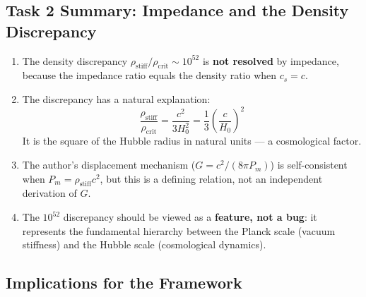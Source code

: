 \documentclass[11pt,a4paper]{article}
\newcommand{\rhocrit}{\ensuremath{\rho_{\mathrm{crit}}}}
\newcommand{\rhostiff}{\ensuremath{\rho_{\mathrm{stiff}}}}
\theoremstyle{definition}
\begin{document}
\subsection{Task 2 Summary: Impedance and the Density Discrepancy}

\begin{enumerate}
    \item The density discrepancy $\rhostiff/\rhocrit \sim 10^{52}$ is \textbf{not resolved} by impedance, because the impedance ratio equals the density ratio when $c_s = c$.

    \item The discrepancy has a natural explanation:
    \begin{equation}
    \frac{\rhostiff}{\rhocrit} = \frac{c^2}{3H_0^2} = \frac{1}{3}\left(\frac{c}{H_0}\right)^2
    \end{equation}
    It is the square of the Hubble radius in natural units --- a cosmological factor.

    \item The author's displacement mechanism ($G = c^2/(8\pi P_m)$) is self-consistent when $P_m = \rhostiff c^2$, but this is a defining relation, not an independent derivation of $G$.

    \item The $10^{52}$ discrepancy should be viewed as a \textbf{feature, not a bug}: it represents the fundamental hierarchy between the Planck scale (vacuum stiffness) and the Hubble scale (cosmological dynamics).
\end{enumerate}

\subsection{Implications for the Framework}
\end{document}
